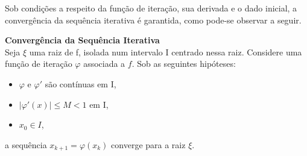 Sob condições a respeito da função de iteração, sua derivada e o dado inicial, a convergência da sequência iterativa é garantida, como pode-se observar a seguir.
\begin{teo} \textbf{Convergência da Sequência Iterativa} \label{teoMPF}\\
    Seja $\xi$ uma raiz de f, isolada num intervalo I centrado nessa raiz. Considere uma função de iteração $\varphi$ associada a $f$. Sob as seguintes hipóteses:
    \begin{itemize}
        \item[i)] $\varphi$ e $\varphi'$ são contínuas em I,
        \item [ii)] $|\varphi'(x)| \leq M < 1$ em I,
        \item [iii)] $x_0 \in I$,
    \end{itemize}
    a sequência $x_{k+1} = \varphi(x_k)$ converge para a raiz $\xi$. 
\end{teo}
